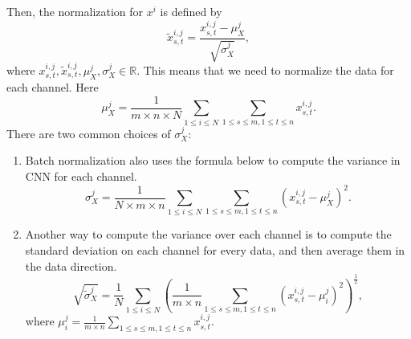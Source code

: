 Then, the normalization for $x^i$ is defined by
\begin{equation}\label{key}
\tilde x^{i,j}_{s,t} = \frac{x^{i,j}_{s,t} - \mu_X^j }{\sqrt{\sigma_X^j}},
\end{equation}
where %
$
x^{i,j}_{s,t}, \tilde x^{i,j}_{s,t}, \mu_X^j, \sigma_X^j \in \mathbb{R}.
$
This means that we need to normalize the data for each channel. Here
\begin{equation}\label{key}
\mu_X^j = \frac{1}{m\times n\times N} \sum_{ 1 \le i \le N} \sum_{1\le s \le m, 1 \le t \le n} x^{i,j}_{s,t}.
\end{equation}
There are two common choices of $\sigma_X^j$:
\begin{enumerate}
\item Batch normalization also uses the 
formula below to compute the variance in CNN for each channel.
\begin{equation}\label{key}
\sigma_X^j = \frac{1}{ N \times m\times n} \sum_{ 1 \le i \le N} \sum_{1\le s \le m, 1 \le t \le n} (x^{i,j}_{s,t} -\mu_X^j )^2.
\end{equation}
\item
Another way to compute the variance over each channel is to compute the standard deviation on each channel for every data,
and then average them in the data direction.
\begin{equation}\label{key}
\sqrt{\tilde \sigma_X^j} = \frac{1}{ N} \sum_{ 1 \le i \le N}  \left( \frac{1}{m\times n}\sum_{1\le s \le m, 1 \le t \le n} (x^{i,j}_{s,t} - \mu_i^j )^2 \right)^{\frac{1}{2}},
\end{equation}
where
$\displaystyle 
\mu_i^j  = \frac{1}{m\times n} \sum_{1\le s \le m, 1 \le t \le n} x^{i,j}_{s,t}.
$
\end{enumerate}

